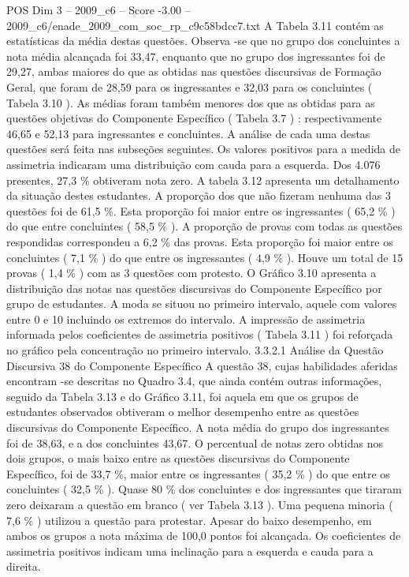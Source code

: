 \begin{textsample}{POS Dim 3 – 2009\_c6 – Score -3.00 – 2009\_c6/enade\_2009\_com\_soc\_rp\_c9c58bdcc7.txt}
A Tabela 3.11 contém as estatísticas da média destas questões.
Observa -se que no grupo dos concluintes a nota média alcançada foi 33,47, enquanto que no grupo dos ingressantes foi de 29,27, ambas maiores do que as obtidas nas questões discursivas de Formação Geral, que foram de 28,59 para os ingressantes e 32,03 para os concluintes ( Tabela 3.10 ).
As médias foram também menores dos que as obtidas para as questões objetivas do Componente Específico ( Tabela 3.7 ) : respectivamente 46,65 e 52,13 para ingressantes e concluintes.
A análise de cada uma destas questões será feita nas subseções seguintes.
Os valores positivos para a medida de assimetria indicaram uma distribuição com cauda para a esquerda.
Dos 4.076 presentes, 27,3 \% obtiveram nota zero.
A tabela 3.12 apresenta um detalhamento da situação destes estudantes.
A proporção dos que não fizeram nenhuma das 3 questões foi de 61,5 \%.
Esta proporção foi maior entre os ingressantes ( 65,2 \% ) do que entre concluintes ( 58,5 \% ).
A proporção de provas com todas as questões respondidas correspondeu a 6,2 \% das provas.
Esta proporção foi maior entre os concluintes ( 7,1 \% ) do que entre os ingressantes ( 4,9 \% ).
Houve um total de 15 provas ( 1,4 \% ) com as 3 questões com protesto.
O Gráfico 3.10 apresenta a distribuição das notas nas questões discursivas do Componente Específico por grupo de estudantes.
A moda se situou no primeiro intervalo, aquele com valores entre 0 e 10 incluindo os extremos do intervalo.
A impressão de assimetria informada pelos coeficientes de assimetria positivos ( Tabela 3.11 ) foi reforçada no gráfico pela concentração no primeiro intervalo. 3.3.2.1 Análise da Questão Discursiva 38 do Componente Específico A questão 38, cujas habilidades aferidas encontram -se descritas no Quadro 3.4, que ainda contém outras informações, seguido da Tabela 3.13 e do Gráfico 3.11, foi aquela em que os grupos de estudantes observados obtiveram o melhor desempenho entre as questões discursivas do Componente Específico.
A nota média do grupo dos ingressantes foi de 38,63, e a dos concluintes 43,67.
O percentual de notas zero obtidas nos dois grupos, o mais baixo entre as questões discursivas do Componente Específico, foi de 33,7 \%, maior entre os ingressantes ( 35,2 \% ) do que entre os concluintes ( 32,5 \% ).
Quase 80 \% dos concluintes e dos ingressantes que tiraram zero deixaram a questão em branco ( ver Tabela 3.13 ).
Uma pequena minoria ( 7,6 \% ) utilizou a questão para protestar.
Apesar do baixo desempenho, em ambos os grupos a nota máxima de 100,0 pontos foi alcançada.
Os coeficientes de assimetria positivos indicam uma inclinação para a esquerda e cauda para a direita.

\end{textsample}
